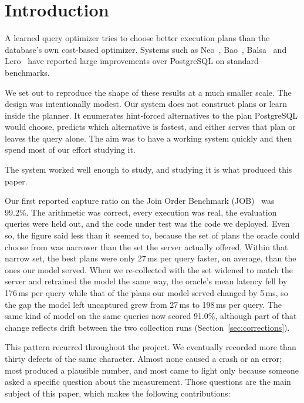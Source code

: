 \documentclass[conference]{IEEEtran}
\begin{document}
\section{Introduction}
\label{sec:intro}

A learned query optimizer tries to choose better execution plans than the
database's own cost-based optimizer. Systems such as Neo~\cite{neo},
Bao~\cite{bao}, Balsa~\cite{balsa} and Lero~\cite{lero} have reported large
improvements over PostgreSQL on standard benchmarks.

We set out to reproduce the shape of these results at a much smaller scale. The
design was intentionally modest. Our system does not construct plans or learn
inside the planner. It enumerates hint-forced alternatives to the plan
PostgreSQL would choose, predicts which alternative is fastest, and either
serves that plan or leaves the query alone. The aim was to have a working system
quickly and then spend most of our effort studying it.

The system worked well enough to study, and studying it is what produced this
paper.

Our first reported capture ratio on the Join Order Benchmark
(JOB)~\cite{leis,jobrepo} was 99.2\%. The arithmetic was correct, every
execution was real, the evaluation queries were held out, and the code under
test was the code we deployed. Even so, the figure said less than it seemed to,
because the set of plans the oracle could choose from was narrower than the set
the server actually offered. Within that narrow set, the best plans were only
27\,ms per query faster, on average, than the ones our model served. When we
re-collected with the set widened to match the server and retrained the model
the same way, the oracle's mean latency fell by 176\,ms per query while that of
the plans our model served changed by 5\,ms, so the gap the model left
uncaptured grew from 27\,ms to 198\,ms per query. The same kind of model on the
same queries now scored 91.0\%, although part of that change reflects drift
between the two collection runs (Section~\ref{sec:corrections}).

This pattern recurred throughout the project. We eventually recorded more than
thirty defects of the same character. Almost none caused a crash or an error;
most produced a plausible number, and most came to light only because someone
asked a specific question about the measurement. Those questions are the main subject
of this paper, which makes the following contributions:
\end{document}

